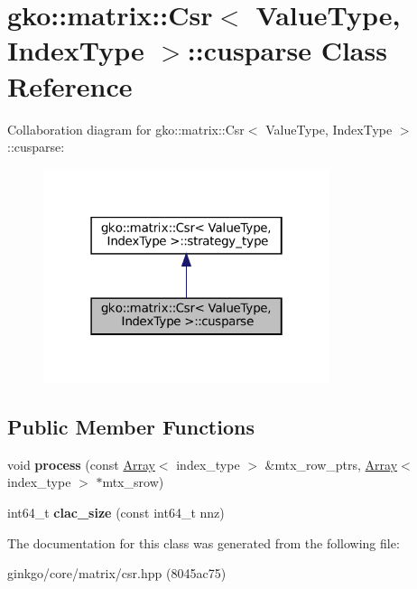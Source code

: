 \hypertarget{classgko_1_1matrix_1_1Csr_1_1cusparse}{}\section{gko\+:\+:matrix\+:\+:Csr$<$ Value\+Type, Index\+Type $>$\+:\+:cusparse Class Reference}
\label{classgko_1_1matrix_1_1Csr_1_1cusparse}


Collaboration diagram for gko\+:\+:matrix\+:\+:Csr$<$ Value\+Type, Index\+Type $>$\+:\+:cusparse\+:
\nopagebreak
\begin{figure}[H]
\begin{center}
\leavevmode
\includegraphics[width=238pt]{classgko_1_1matrix_1_1Csr_1_1cusparse__coll__graph}
\end{center}
\end{figure}
\subsection*{Public Member Functions}
\begin{DoxyCompactItemize}
\item 
\mbox{\label{classgko_1_1matrix_1_1Csr_1_1cusparse_ad913d7450cec714fda555ac1a0c781bc}} 
void {\bfseries process} (const \hyperlink{classgko_1_1Array}{Array}$<$ index\+\_\+type $>$ \&mtx\+\_\+row\+\_\+ptrs, \hyperlink{classgko_1_1Array}{Array}$<$ index\+\_\+type $>$ $\ast$mtx\+\_\+srow)
\item 
\mbox{\label{classgko_1_1matrix_1_1Csr_1_1cusparse_a3a11fb0655b828fb590a87f5f83e9373}} 
int64\+\_\+t {\bfseries clac\+\_\+size} (const int64\+\_\+t nnz)
\end{DoxyCompactItemize}


The documentation for this class was generated from the following file\+:\begin{DoxyCompactItemize}
\item 
ginkgo/core/matrix/csr.\+hpp (8045ac75)\end{DoxyCompactItemize}
